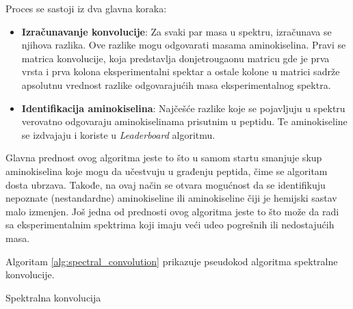 \documentclass[12pt,oneside]{memoir}
\begin{document}
Proces se sastoji iz dva glavna koraka:

\begin{itemize}
    \item \textbf{Izračunavanje konvolucije}: Za svaki par masa u spektru, izračunava se njihova razlika. Ove razlike mogu odgovarati masama aminokiselina. Pravi se matrica konvolucije, koja predstavlja donjetrougaonu matricu gde je prva vrsta i prva kolona eksperimentalni spektar a ostale kolone u matrici sadrže apsolutnu vrednost razlike odgovarajućih masa eksperimentalnog spektra.
    \item \textbf{Identifikacija aminokiselina}: Najčešće razlike koje se pojavljuju u spektru verovatno odgovaraju aminokiselinama prisutnim u peptidu. Te aminokiseline se izdvajaju i koriste u \emph{Leaderboard} algoritmu.
\end{itemize}

Glavna prednost ovog algoritma jeste to što u samom startu smanjuje skup aminokiselina koje mogu da učestvuju u građenju peptida, čime se algoritam dosta ubrzava. Takođe, na ovaj način se otvara mogućnost da se identifikuju nepoznate (nestandardne) aminokiseline ili aminokiseline čiji je hemijski sastav malo izmenjen. Još jedna od prednosti ovog algoritma jeste to što može da radi sa eksperimentalnim spektrima koji imaju veći udeo pogrešnih ili nedostajućih masa.

Algoritam \ref{alg:spectral_convolution} prikazuje pseudokod algoritma spektralne konvolucije.

\begin{algorithm}[h]
\caption{Spektralna konvolucija}
\label{alg:spectral_convolution}
\SetAlgoLined
\DontPrintSemicolon
{}
\end{algorithm}
\end{document}
